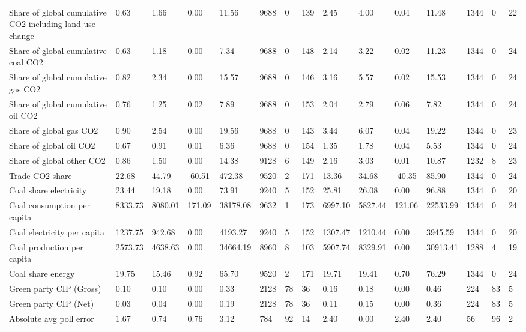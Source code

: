 \begin{longtable}{lllllllllllllll}
Share of global cumulative CO2 including land use change & 0.63 & 1.66 & 0.00 & 11.56 & 9688 & 0 & 139 & 2.45 & 4.00 & 0.04 & 11.48 & 1344 & 0 & 22\\
Share of global cumulative coal CO2 & 0.63 & 1.18 & 0.00 & 7.34 & 9688 & 0 & 148 & 2.14 & 3.22 & 0.02 & 11.23 & 1344 & 0 & 24\\
Share of global cumulative gas CO2 & 0.82 & 2.34 & 0.00 & 15.57 & 9688 & 0 & 146 & 3.16 & 5.57 & 0.02 & 15.53 & 1344 & 0 & 24\\
Share of global cumulative oil CO2 & 0.76 & 1.25 & 0.02 & 7.89 & 9688 & 0 & 153 & 2.04 & 2.79 & 0.06 & 7.82 & 1344 & 0 & 24\\
\addlinespace
Share of global gas CO2 & 0.90 & 2.54 & 0.00 & 19.56 & 9688 & 0 & 143 & 3.44 & 6.07 & 0.04 & 19.22 & 1344 & 0 & 23\\
Share of global oil CO2 & 0.67 & 0.91 & 0.01 & 6.36 & 9688 & 0 & 154 & 1.35 & 1.78 & 0.04 & 5.53 & 1344 & 0 & 24\\
Share of global other CO2 & 0.86 & 1.50 & 0.00 & 14.38 & 9128 & 6 & 149 & 2.16 & 3.03 & 0.01 & 10.87 & 1232 & 8 & 23\\
Trade CO2 share & 22.68 & 44.79 & -60.51 & 472.38 & 9520 & 2 & 171 & 13.36 & 34.68 & -40.35 & 85.90 & 1344 & 0 & 24\\
Coal share electricity & 23.44 & 19.18 & 0.00 & 73.91 & 9240 & 5 & 152 & 25.81 & 26.08 & 0.00 & 96.88 & 1344 & 0 & 20\\
\addlinespace
Coal consumption per capita & 8333.73 & 8080.01 & 171.09 & 38178.08 & 9632 & 1 & 173 & 6997.10 & 5827.44 & 121.06 & 22533.99 & 1344 & 0 & 24\\
Coal electricity per capita & 1237.75 & 942.68 & 0.00 & 4193.27 & 9240 & 5 & 152 & 1307.47 & 1210.44 & 0.00 & 3945.59 & 1344 & 0 & 20\\
Coal production per capita & 2573.73 & 4638.63 & 0.00 & 34664.19 & 8960 & 8 & 103 & 5907.74 & 8329.91 & 0.00 & 30913.41 & 1288 & 4 & 19\\
Coal share energy & 19.75 & 15.46 & 0.92 & 65.70 & 9520 & 2 & 171 & 19.71 & 19.41 & 0.70 & 76.29 & 1344 & 0 & 24\\
Green party CIP (Gross) & 0.10 & 0.10 & 0.00 & 0.33 & 2128 & 78 & 36 & 0.16 & 0.18 & 0.00 & 0.46 & 224 & 83 & 5\\
\addlinespace
Green party CIP (Net) & 0.03 & 0.04 & 0.00 & 0.19 & 2128 & 78 & 36 & 0.11 & 0.15 & 0.00 & 0.36 & 224 & 83 & 5\\
Absolute avg poll error & 1.67 & 0.74 & 0.76 & 3.12 & 784 & 92 & 14 & 2.40 & 0.00 & 2.40 & 2.40 & 56 & 96 & 2\\

\end{longtable}
